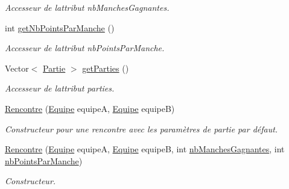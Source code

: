 \begin{DoxyCompactItemize}
\begin{DoxyCompactList}\small\item\em Accesseur de l\textquotesingle{}attribut nb\+Manches\+Gagnantes. \end{DoxyCompactList}\item 
int \hyperlink{classcom_1_1example_1_1area_1_1_rencontre_a539e26b8c59998880fcf9b7c9f2b685a}{get\+Nb\+Points\+Par\+Manche} ()
\begin{DoxyCompactList}\small\item\em Accesseur de l\textquotesingle{}attribut nb\+Points\+Par\+Manche. \end{DoxyCompactList}\item 
Vector$<$ \hyperlink{classcom_1_1example_1_1area_1_1_partie}{Partie} $>$ \hyperlink{classcom_1_1example_1_1area_1_1_rencontre_a58b62bd2f8a63f532df2bc8607268a2d}{get\+Parties} ()
\begin{DoxyCompactList}\small\item\em Accesseur de l\textquotesingle{}attribut parties. \end{DoxyCompactList}\item 
\hyperlink{classcom_1_1example_1_1area_1_1_rencontre_abc915d4578268471bfab8214928bbd74}{Rencontre} (\hyperlink{classcom_1_1example_1_1area_1_1_equipe}{Equipe} equipeA, \hyperlink{classcom_1_1example_1_1area_1_1_equipe}{Equipe} equipeB)
\begin{DoxyCompactList}\small\item\em Constructeur pour une rencontre avec les paramètres de partie par défaut. \end{DoxyCompactList}\item 
\hyperlink{classcom_1_1example_1_1area_1_1_rencontre_a28c1f3173d0d0a81abb80fac81a184d4}{Rencontre} (\hyperlink{classcom_1_1example_1_1area_1_1_equipe}{Equipe} equipeA, \hyperlink{classcom_1_1example_1_1area_1_1_equipe}{Equipe} equipeB, int \hyperlink{classcom_1_1example_1_1area_1_1_rencontre_aef266bd256aecd70fbd02cf07625ed14}{nb\+Manches\+Gagnantes}, int \hyperlink{classcom_1_1example_1_1area_1_1_rencontre_ae1849c4bcdcfbb2d336b750a36be1162}{nb\+Points\+Par\+Manche})
\begin{DoxyCompactList}\small\item\em Constructeur. \end{DoxyCompactList}\end{DoxyCompactItemize}

